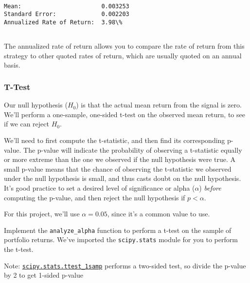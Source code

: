 \documentclass[11pt]{article}
\begin{document}
    \begin{Verbatim}[commandchars=\\\{\}]

Mean:                       0.003253
Standard Error:             0.002203
Annualized Rate of Return:  3.98\%


    \end{Verbatim}

    The annualized rate of return allows you to compare the rate of return
from this strategy to other quoted rates of return, which are usually
quoted on an annual basis.

\subsubsection{T-Test}\label{t-test}

Our null hypothesis (\(H_0\)) is that the actual mean return from the
signal is zero. We'll perform a one-sample, one-sided t-test on the
observed mean return, to see if we can reject \(H_0\).

We'll need to first compute the t-statistic, and then find its
corresponding p-value. The p-value will indicate the probability of
observing a t-statistic equally or more extreme than the one we observed
if the null hypothesis were true. A small p-value means that the chance
of observing the t-statistic we observed under the null hypothesis is
small, and thus casts doubt on the null hypothesis. It's good practice
to set a desired level of significance or alpha (\(\alpha\))
\emph{before} computing the p-value, and then reject the null hypothesis
if \(p < \alpha\).

For this project, we'll use \(\alpha = 0.05\), since it's a common value
to use.

Implement the \texttt{analyze\_alpha} function to perform a t-test on
the sample of portfolio returns. We've imported the \texttt{scipy.stats}
module for you to perform the t-test.

Note:
\href{https://docs.scipy.org/doc/scipy-1.0.0/reference/generated/scipy.stats.ttest_1samp.html}{\texttt{scipy.stats.ttest\_1samp}}
performs a two-sided test, so divide the p-value by 2 to get 1-sided
p-value
\end{document}
